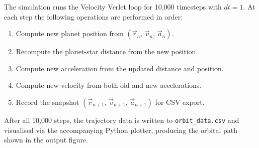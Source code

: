 The simulation runs the Velocity Verlet loop for 10,000 timesteps with $dt = 1$. At each step the following operations are performed in order:

\begin{enumerate}
    \item Compute new planet position from $(\vec{r}_n,\, \vec{v}_n,\, \vec{a}_n)$.
    \item Recompute the planet-star distance from the new position.
    \item Compute new acceleration from the updated distance and position.
    \item Compute new velocity from both old and new accelerations.
    \item Record the snapshot $(\vec{r}_{n+1},\, \vec{v}_{n+1},\, \vec{a}_{n+1})$ for CSV export.
\end{enumerate}

After all 10,000 steps, the trajectory data is written to \texttt{orbit\_data.csv} and visualised via the accompanying Python plotter, producing the orbital path shown in the output figure.